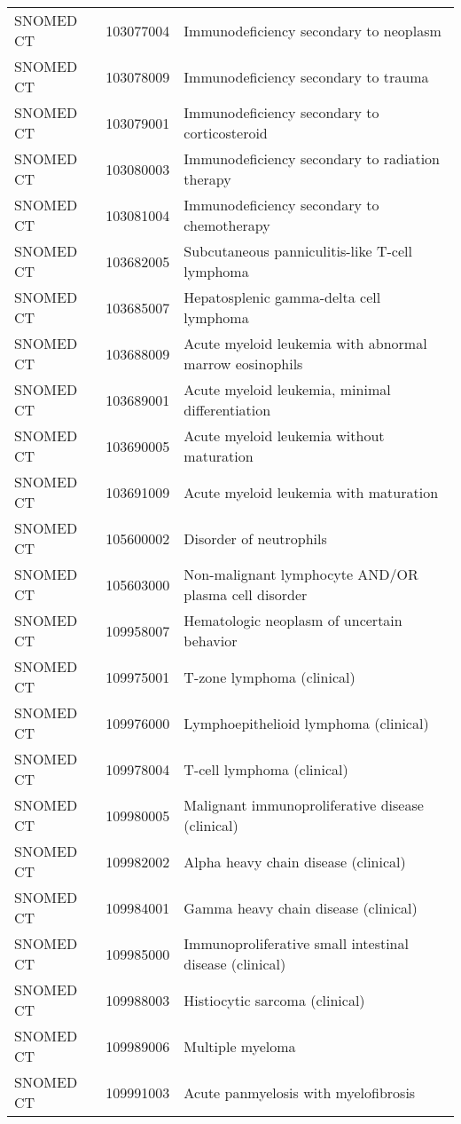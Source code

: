 \begin{table}[ht]
\begin{tabular}{lll}
  SNOMED CT & 103077004 & Immunodeficiency secondary to neoplasm \\ 
  SNOMED CT & 103078009 & Immunodeficiency secondary to trauma \\ 
  SNOMED CT & 103079001 & Immunodeficiency secondary to corticosteroid \\ 
  SNOMED CT & 103080003 & Immunodeficiency secondary to radiation therapy \\ 
  SNOMED CT & 103081004 & Immunodeficiency secondary to chemotherapy \\ 
  SNOMED CT & 103682005 & Subcutaneous panniculitis-like T-cell lymphoma \\ 
  SNOMED CT & 103685007 & Hepatosplenic gamma-delta cell lymphoma \\ 
  SNOMED CT & 103688009 & Acute myeloid leukemia with abnormal marrow eosinophils \\ 
  SNOMED CT & 103689001 & Acute myeloid leukemia, minimal differentiation \\ 
  SNOMED CT & 103690005 & Acute myeloid leukemia without maturation \\ 
  SNOMED CT & 103691009 & Acute myeloid leukemia with maturation \\ 
  SNOMED CT & 105600002 & Disorder of neutrophils \\ 
  SNOMED CT & 105603000 & Non-malignant lymphocyte AND/OR plasma cell disorder \\ 
  SNOMED CT & 109958007 & Hematologic neoplasm of uncertain behavior \\ 
  SNOMED CT & 109975001 & T-zone lymphoma (clinical) \\ 
  SNOMED CT & 109976000 & Lymphoepithelioid lymphoma (clinical) \\ 
  SNOMED CT & 109978004 & T-cell lymphoma (clinical) \\ 
  SNOMED CT & 109980005 & Malignant immunoproliferative disease (clinical) \\ 
  SNOMED CT & 109982002 & Alpha heavy chain disease (clinical) \\ 
  SNOMED CT & 109984001 & Gamma heavy chain disease (clinical) \\ 
  SNOMED CT & 109985000 & Immunoproliferative small intestinal disease (clinical) \\ 
  SNOMED CT & 109988003 & Histiocytic sarcoma (clinical) \\ 
  SNOMED CT & 109989006 & Multiple myeloma \\ 
  SNOMED CT & 109991003 & Acute panmyelosis with myelofibrosis \\ 

\end{tabular}
\end{table}
